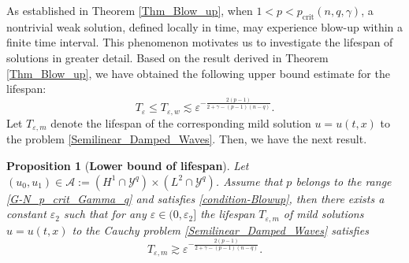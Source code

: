 \documentclass[11pt,reqno]{amsart}
\newtheorem{proposition}{Proposition}[section]
\begin{document}
As established in Theorem \ref{Thm_Blow_up}, when $1<p<p_{\mathrm{crit}}(n, q, \gamma)$, a nontrivial weak solution, defined locally in time, may experience blow-up within a finite time interval. This phenomenon motivates us to investigate the lifespan of solutions in greater detail. Based on the result derived in Theorem \ref{Thm_Blow_up}, we have obtained the following upper bound estimate for the lifespan:
$$
T_{\varepsilon}\leq T_{\varepsilon,w}\lesssim \varepsilon^{-\frac{2(p-1)}{2+\gamma-(p-1)(n-q)}}.
$$
Let $T_{\varepsilon,m}$ denote the lifespan of the corresponding mild solution $u=u(t,x)$ to the problem \eqref{Semilinear_Damped_Waves}. Then, we have the next result.
\begin{proposition}[\textbf{Lower bound of lifespan}]\label{Thm_Lower_Bound}
Let $(u_0,u_1)\in \mathcal{A}:=(H^1\cap \mathcal{Y}^q)\times (L^2\cap \mathcal{Y}^q)$. Assume that $p$ belongs to the range \eqref{G-N_p_crit_Gamma_q} and satisfies \eqref{condition-Blowup}, then there exists a constant $\varepsilon_2$ such that for any $\varepsilon\in(0,\varepsilon_2]$ the lifespan $T_{\varepsilon,m}$ of mild solutions $u=u(t,x)$ to the Cauchy problem \eqref{Semilinear_Damped_Waves} satisfies
$$
T_{\varepsilon, m}\gtrsim \varepsilon^{-\frac{2(p-1)}{2+\gamma-(p-1)(n-q)}}.
$$
\end{proposition}
\end{document}
